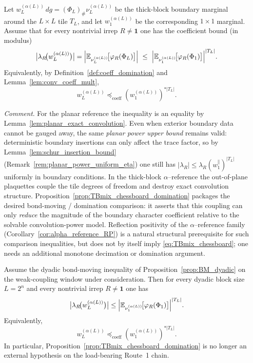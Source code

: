 \begin{proposition}\label{prop:TBmix_chessboard_domination}
Let $w_L^{(\alpha(L))}\,dg=(\Phi_L)_{\#}\nu_L^{(\alpha(L))}$ be the thick-block boundary marginal around the $L\times L$ tile $T_L$, and let
$w_1^{(\alpha(L))}$ be the corresponding $1\times 1$ marginal.
Assume that for every nontrivial irrep $R\neq\mathbf 1$ one has the coefficient bound (in modulus)
\begin{equation}\label{eq:TBmix_chessboard}
\bigl|\lambda_R\!\bigl(w_L^{(\alpha(L))}\bigr)\bigr|
=\Bigl|\mathbb E_{\nu_L^{(\alpha(L))}}\!\big[\varphi_R(\Phi_L)\big]\Bigr|
\ \le\
\Bigl|\mathbb E_{\nu_1^{(\alpha(L))}}\!\big[\varphi_R(\Phi_1)\big]\Bigr|^{|T_L|}.
\end{equation}
\noindent Equivalently, by Definition~\ref{def:coeff_domination} and Lemma~\ref{lem:conv_coeff_mult},
\[
w_L^{(\alpha(L))} \preceq_{\mathrm{coeff}} (w_1^{(\alpha(L))})^{*|T_L|}.
\]

\end{proposition}

\noindent\emph{Comment.} For the planar reference the inequality is an equality by Lemma~\ref{lem:planar_exact_convolution}. Even when exterior boundary data cannot be gauged away, the same \emph{planar power upper bound} remains valid: deterministic boundary insertions can only affect the trace factor, so by Lemma~\ref{lem:schur_insertion_bound} (Remark~\ref{rem:planar_power_uniform_eta}) one still has $|\lambda_R|\le \lambda_R(w_1^{\parallel})^{|T_L|}$ uniformly in boundary conditions.
In the thick-block $\alpha$--reference the out-of-plane plaquettes couple the tile degrees of freedom and destroy exact convolution structure.
Proposition~\ref{prop:TBmix_chessboard_domination} packages the desired bond-moving / domination comparison: it asserts that this coupling can only \emph{reduce}
the magnitude of the boundary character coefficient relative to the solvable convolution-power model.
Reflection positivity of the $\alpha$--reference family (Corollary~\ref{cor:alpha_reference_RP}) is a natural structural prerequisite for such comparison inequalities,
but does not by itself imply \eqref{eq:TBmix_chessboard}; one needs an additional monotone decimation or domination argument.

\begin{proposition}\label{prop:TBmix_chessboard_proved}
Assume the dyadic bond-moving inequality of Proposition~\ref{prop:BM_dyadic} on the weak-coupling window under consideration.
Then for every dyadic block size $L=2^n$ and every nontrivial irrep $R\neq \mathbf 1$ one has
\begin{equation}\label{eq:TBmix_chessboard_proved}
\bigl|\lambda_R\!\bigl(w_L^{(\alpha(L))}\bigr)\bigr|
\le
\Bigl|\mathbb E_{\nu_1^{(\alpha(L))}}\!\big[\varphi_R(\Phi_1)\big]\Bigr|^{|T_L|}.
\end{equation}
Equivalently,
\[
 w_L^{(\alpha(L))} \preceq_{\mathrm{coeff}} (w_1^{(\alpha(L))})^{*|T_L|}.
\]
In particular, Proposition~\ref{prop:TBmix_chessboard_domination} is no longer an external hypothesis on the load-bearing Route~1 chain.
\end{proposition}

